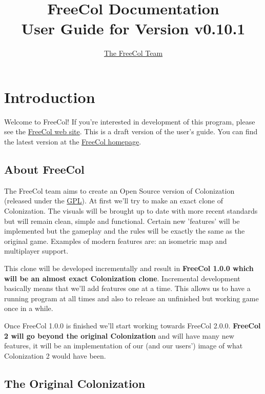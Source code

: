 \documentclass[12pt]{book}
\begin{document}
\author{\href{http://freecol.sourceforge.net/index.php?section=8}{The FreeCol Team}}
\title{FreeCol Documentation\\User Guide for Version v0.10.1}
\maketitle{}

\tableofcontents
\newpage


\hypertarget{Introduction}{\chapter{Introduction}}

Welcome to FreeCol! If you're interested in development of this
program, please see the \href{http://freecol.sourceforge.net}{FreeCol
web site}. This is a draft version of the user's guide. You can find
the latest version at the
\href{http://freecol.sourceforge.net}{FreeCol homepage}.

\hypertarget{About FreeCol}{\section{About FreeCol}}

The FreeCol team aims to create an Open Source version of
Colonization (released under the
\href{http://www.gnu.org/licenses/gpl.html}{GPL}). At
first we'll try to make an exact clone of Colonization. The visuals
will be brought up to date with more recent standards but will remain
clean, simple and functional. Certain new 'features' will be
implemented but the gameplay and the rules will be exactly the same as
the original game. Examples of modern features are: an isometric map
and multiplayer support.

This clone will be developed incrementally and result in
\textbf{FreeCol 1.0.0 which will be an almost exact Colonization
clone}. Incremental development basically means that we'll add
features one at a time. This allows us to have a running program at
all times and also to release an unfinished but working game once in a
while.

Once FreeCol 1.0.0 is finished we'll start working towards FreeCol
2.0.0. \textbf{FreeCol 2 will go beyond the original Colonization} and
will have many new features, it will be an implementation of our (and
our users') image of what Colonization 2 would have been.


\hypertarget{The Original Colonization}{\section{The Original Colonization}}
\end{document}
